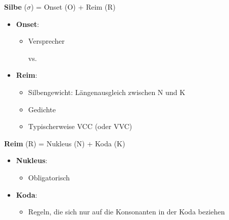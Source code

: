 \begin{frame}

\textbf{Silbe} ($\sigma$) = Onset (O) + Reim (R)

\begin{itemize}
	\item \textbf{Onset}: 
	\begin{itemize}
		\item Versprecher
	
	          \ea
                   vs. 
                  \z

	\end{itemize}	
			
	\item \textbf{Reim}: 
	\begin{itemize}
		\item Silbengewicht: Längenausgleich zwischen N und K 		



		\item Gedichte
		\item Typischerweise VCC (oder VVC)
	\end{itemize}
	
\end{itemize}

\textbf{Reim} (R) = Nukleus (N) + Koda (K)

\begin{itemize}
	\item \textbf{Nukleus}: 
	\begin{itemize}
		\item Obligatorisch
	\end{itemize}	
			
	\item \textbf{Koda}: 
	\begin{itemize}
		\item Regeln, die sich nur auf die Konsonanten in der Koda beziehen
	\end{itemize}
	
\end{itemize}

\end{frame}



